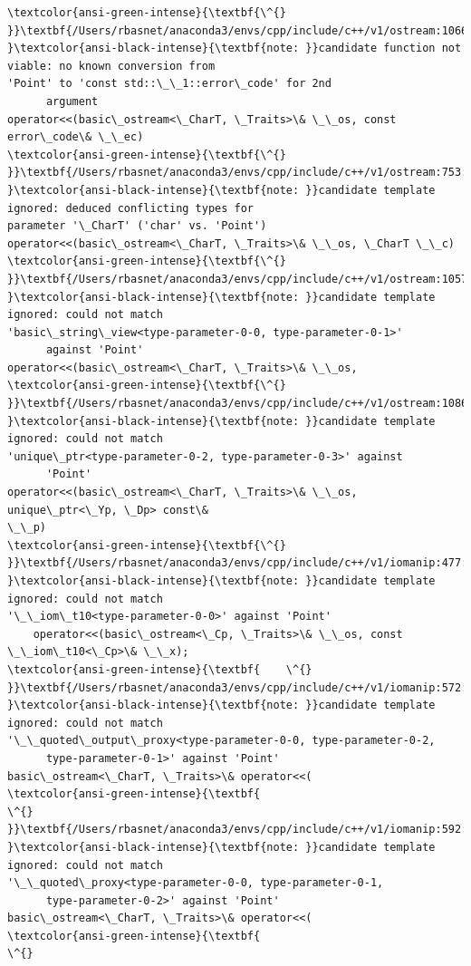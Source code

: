 \documentclass[11pt]{article}
\begin{document}
\begin{Verbatim}[commandchars=\\\{\}]
\textcolor{ansi-green-intense}{\textbf{\^{}
}}\textbf{/Users/rbasnet/anaconda3/envs/cpp/include/c++/v1/ostream:1066:1:
}\textcolor{ansi-black-intense}{\textbf{note: }}candidate function not viable: no known conversion from
'Point' to 'const std::\_\_1::error\_code' for 2nd
      argument
operator<<(basic\_ostream<\_CharT, \_Traits>\& \_\_os, const error\_code\& \_\_ec)
\textcolor{ansi-green-intense}{\textbf{\^{}
}}\textbf{/Users/rbasnet/anaconda3/envs/cpp/include/c++/v1/ostream:753:1:
}\textcolor{ansi-black-intense}{\textbf{note: }}candidate template ignored: deduced conflicting types for
parameter '\_CharT' ('char' vs. 'Point')
operator<<(basic\_ostream<\_CharT, \_Traits>\& \_\_os, \_CharT \_\_c)
\textcolor{ansi-green-intense}{\textbf{\^{}
}}\textbf{/Users/rbasnet/anaconda3/envs/cpp/include/c++/v1/ostream:1057:1:
}\textcolor{ansi-black-intense}{\textbf{note: }}candidate template ignored: could not match
'basic\_string\_view<type-parameter-0-0, type-parameter-0-1>'
      against 'Point'
operator<<(basic\_ostream<\_CharT, \_Traits>\& \_\_os,
\textcolor{ansi-green-intense}{\textbf{\^{}
}}\textbf{/Users/rbasnet/anaconda3/envs/cpp/include/c++/v1/ostream:1086:1:
}\textcolor{ansi-black-intense}{\textbf{note: }}candidate template ignored: could not match
'unique\_ptr<type-parameter-0-2, type-parameter-0-3>' against
      'Point'
operator<<(basic\_ostream<\_CharT, \_Traits>\& \_\_os, unique\_ptr<\_Yp, \_Dp> const\&
\_\_p)
\textcolor{ansi-green-intense}{\textbf{\^{}
}}\textbf{/Users/rbasnet/anaconda3/envs/cpp/include/c++/v1/iomanip:477:5:
}\textcolor{ansi-black-intense}{\textbf{note: }}candidate template ignored: could not match
'\_\_iom\_t10<type-parameter-0-0>' against 'Point'
    operator<<(basic\_ostream<\_Cp, \_Traits>\& \_\_os, const \_\_iom\_t10<\_Cp>\& \_\_x);
\textcolor{ansi-green-intense}{\textbf{    \^{}
}}\textbf{/Users/rbasnet/anaconda3/envs/cpp/include/c++/v1/iomanip:572:33:
}\textcolor{ansi-black-intense}{\textbf{note: }}candidate template ignored: could not match
'\_\_quoted\_output\_proxy<type-parameter-0-0, type-parameter-0-2,
      type-parameter-0-1>' against 'Point'
basic\_ostream<\_CharT, \_Traits>\& operator<<(
\textcolor{ansi-green-intense}{\textbf{                                \^{}
}}\textbf{/Users/rbasnet/anaconda3/envs/cpp/include/c++/v1/iomanip:592:33:
}\textcolor{ansi-black-intense}{\textbf{note: }}candidate template ignored: could not match
'\_\_quoted\_proxy<type-parameter-0-0, type-parameter-0-1,
      type-parameter-0-2>' against 'Point'
basic\_ostream<\_CharT, \_Traits>\& operator<<(
\textcolor{ansi-green-intense}{\textbf{                                \^{}

\end{Verbatim}
\end{document}
